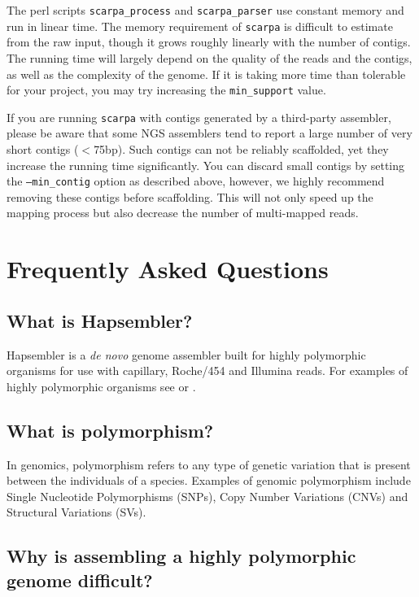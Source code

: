 \documentclass[12pt,a4paper]{report}
\begin{document}
The perl scripts \texttt{scarpa\_process} and \texttt{scarpa\_parser} use constant memory and run in linear time. The memory requirement of \texttt{scarpa} is difficult to estimate from the raw input, though it grows roughly linearly with the number of contigs. The running time will largely  depend on the quality of the reads and the contigs, as well as the complexity of the genome. If it is taking more time than tolerable for your project, you may try increasing the \texttt{min\_support} value.

If you are running \texttt{scarpa} with contigs generated by a third-party assembler, please be aware that some NGS assemblers tend to report a large number of very short contigs ($<$75bp). Such contigs can not be reliably scaffolded, yet they increase the running time significantly. You can discard small contigs by setting the \texttt{--min\_contig} option as described above, however, we highly recommend removing these contigs before scaffolding. This will not only speed up the mapping process but also decrease the number of multi-mapped reads. 

\section{Frequently Asked Questions}
\label{faq}

\subsection{What is Hapsembler?}

Hapsembler\cite{donmez2} is a \emph{de novo} genome assembler built for highly polymorphic organisms for use with capillary, Roche/454 and Illumina reads. For examples of highly polymorphic organisms see \cite{small2} or \cite{sodergren}.

\subsection{What is polymorphism?}

In genomics, polymorphism refers to any type of genetic variation that is present between the individuals of a species. Examples of genomic polymorphism include Single Nucleotide Polymorphisms (SNPs), Copy Number Variations (CNVs) and Structural Variations (SVs).

\subsection{Why is assembling a highly polymorphic genome difficult?}
\end{document}

